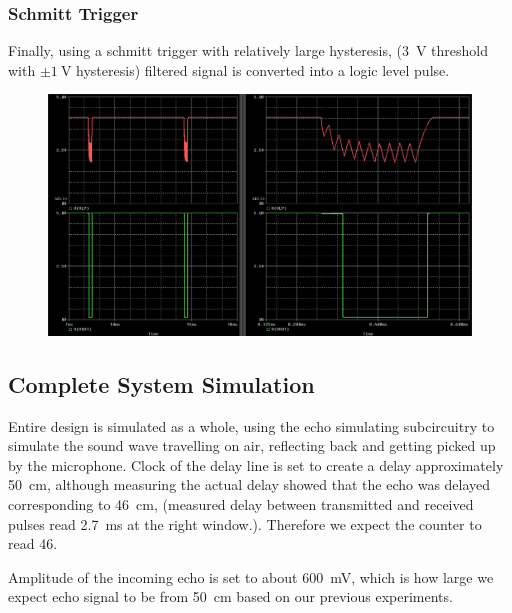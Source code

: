 \documentclass[12pt, a4paper]{article}
\begin{document}
            \pagebreak
            \subsubsection{Schmitt Trigger}
                \noindent Finally, using a schmitt trigger with relatively large hysteresis, (\SI{3}{\volt} threshold with $\pm \SI{1}{\volt}$ hysteresis) filtered signal is converted into a logic level pulse.

                \begin{figure}[H]\centering
                    \includegraphics[width = \textwidth]{simulations/receive/schmitt.png}
                    \caption[]{}
                \end{figure}
       
        
        \pagebreak
        \subsection{Complete System Simulation}

            Entire design is simulated as a whole, using the echo simulating subcircuitry to simulate the sound wave travelling on air, reflecting back and getting picked up by the microphone. Clock of the delay line is set to create a delay  approximately \SI{50}{\centi\metre}, although measuring the actual delay showed that the echo was delayed corresponding to \SI{46}{\centi\meter}, (measured delay between transmitted and received pulses read \SI{2.7}{\milli\second} at the right window.). Therefore we expect the counter to read 46.  

            \noindent Amplitude of the incoming echo is set to about \SI{600}{\milli\volt}, which is how large we expect echo signal to be from \SI{50}{\centi\meter} based on our previous experiments.
\end{document}

